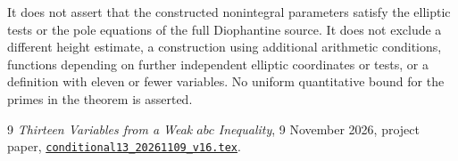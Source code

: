 \documentclass[11pt,a4paper]{article}
\theoremstyle{remark}\newtheorem{remark}[theorem]{Remark}
\begin{document}
It does not assert that the constructed nonintegral parameters
satisfy the elliptic tests or the pole equations of the full
Diophantine source. It does not exclude a different height
estimate, a construction using additional arithmetic conditions,
functions depending on further independent elliptic coordinates
or tests, or a definition with eleven or fewer variables.
No uniform quantitative bound for the primes in the theorem
is asserted.

\begin{thebibliography}{9}
\emph{Thirteen Variables from a Weak \(abc\) Inequality},
9 November 2026, project paper,
\href{https://github.com/JoseBrox/diophantine-z-q_improvements/blob/main/papers/conditional_few_variables/conditional13_20261109_v16.tex}
{\texttt{conditional13\_20261109\_v16.tex}}.
\end{thebibliography}
\end{document}
